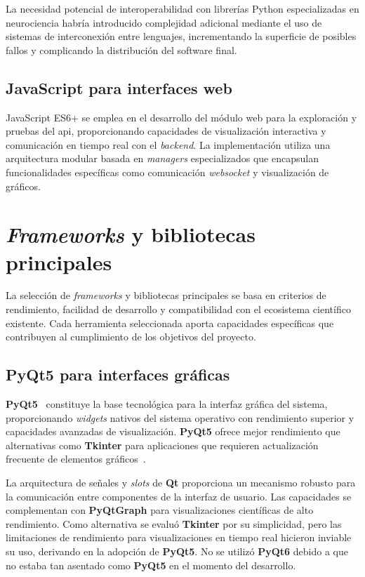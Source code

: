 La necesidad potencial de interoperabilidad con librerías Python especializadas en neurociencia habría introducido complejidad adicional mediante el uso de sistemas de interconexión entre lenguajes, incrementando la superficie de posibles fallos y complicando la distribución del software final.

\subsection{JavaScript para interfaces web}
\label{subsec:javascript_web}

JavaScript ES6+ se emplea en el desarrollo del módulo web para la exploración y pruebas del \acrshort{api}, proporcionando capacidades de visualización interactiva y comunicación en tiempo real con el \textit{backend}. La implementación utiliza una arquitectura modular basada en \textit{\gls{managers}} especializados que encapsulan funcionalidades específicas como comunicación \textit{\gls{websocket}} y visualización de gráficos.

\section{\textit{Frameworks} y bibliotecas principales}
\label{sec:frameworks_principales}

La selección de \textit{\glspl{framework}} y bibliotecas principales se basa en criterios de rendimiento, facilidad de desarrollo y compatibilidad con el ecosistema científico existente. Cada herramienta seleccionada aporta capacidades específicas que contribuyen al cumplimiento de los objetivos del proyecto.

\subsection{\textbf{PyQt5} para interfaces gráficas}
\label{subsec:pyqt5_interfaces}

\textbf{PyQt5}~\cite{pyqt5_docs} constituye la base tecnológica para la interfaz gráfica del sistema, proporcionando \textit{\glspl{widget}} nativos del sistema operativo con rendimiento superior y capacidades avanzadas de visualización. \textbf{PyQt5} ofrece mejor rendimiento que alternativas como \textbf{Tkinter} para aplicaciones que requieren actualización frecuente de elementos gráficos~\cite{gui_performance_python}.

La arquitectura de señales y \textit{\gls{slots}} de \textbf{Qt} proporciona un mecanismo robusto para la comunicación entre componentes de la interfaz de usuario. Las capacidades se complementan con \textbf{PyQtGraph} para visualizaciones científicas de alto rendimiento. Como alternativa se evaluó \textbf{Tkinter} por su simplicidad, pero las limitaciones de rendimiento para visualizaciones en tiempo real hicieron inviable su uso, derivando en la adopción de \textbf{PyQt5}. No se utilizó \textbf{PyQt6} debido a que no estaba tan asentado como \textbf{PyQt5} en el momento del desarrollo.

